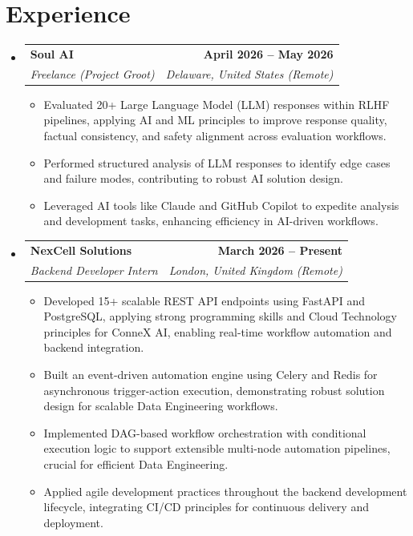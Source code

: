 \documentclass[letterpaper,10pt]{article}
\makeatletter
\newcommand{\resumeItem}[1]{
  \item\small{
    {#1 \vspace{-2pt}}
  }
}
\newcommand{\resumeSubheading}[4]{
  \vspace{-2pt}\item
    \begin{tabular*}{1.0\textwidth}[t]{l@{\extracolsep{\fill}}r}
      \textbf{#1} & \textbf{\small #2} \\
      \textit{\small#3} & \textit{\small #4} \\
    \end{tabular*}\vspace{-7pt}
}
\newcommand{\resumeSubHeadingListStart}{\begin{itemize}[leftmargin=0.0in, label={}]}
\newcommand{\resumeSubHeadingListEnd}{\end{itemize}}
\newcommand{\resumeItemListStart}{\begin{itemize}}
\newcommand{\resumeItemListEnd}{\end{itemize}\vspace{-5pt}}
\makeatother
\begin{document}
\section{Experience}
  \resumeSubHeadingListStart
    \resumeSubheading
      {Soul AI}{April 2026 -- May 2026}
      {Freelance (Project Groot)}{Delaware, United States (Remote)}
      \resumeItemListStart
        \resumeItem{Evaluated 20+ Large Language Model (LLM) responses within RLHF pipelines, applying AI and ML principles to improve response quality, factual consistency, and safety alignment across evaluation workflows.}
        \resumeItem{Performed structured analysis of LLM responses to identify edge cases and failure modes, contributing to robust AI solution design.}
        \resumeItem{Leveraged AI tools like Claude and GitHub Copilot to expedite analysis and development tasks, enhancing efficiency in AI-driven workflows.}
      \resumeItemListEnd
      \resumeSubheading
      {NexCell Solutions}{March 2026 -- Present}
      {Backend Developer Intern}{London, United Kingdom (Remote)}
      \resumeItemListStart
        \resumeItem{Developed 15+ scalable REST API endpoints using FastAPI and PostgreSQL, applying strong programming skills and Cloud Technology principles for ConneX AI, enabling real-time workflow automation and backend integration.}
        \resumeItem{Built an event-driven automation engine using Celery and Redis for asynchronous trigger-action execution, demonstrating robust solution design for scalable Data Engineering workflows.}
        \resumeItem{Implemented DAG-based workflow orchestration with conditional execution logic to support extensible multi-node automation pipelines, crucial for efficient Data Engineering.}
        \resumeItem{Applied agile development practices throughout the backend development lifecycle, integrating CI/CD principles for continuous delivery and deployment.}
      \resumeItemListEnd
  \resumeSubHeadingListEnd

\end{document}
